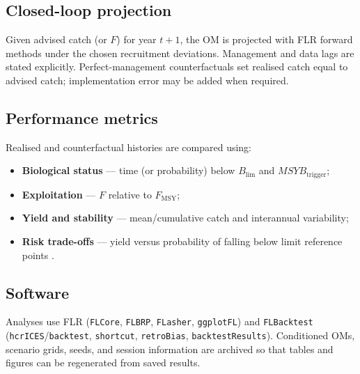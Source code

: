 \subsection{Closed-loop projection}

Given advised catch (or \(F\)) for year \(t{+}1\), the OM is projected with
FLR forward methods under the chosen recruitment deviations. Management and
data lags are stated explicitly. Perfect-management counterfactuals set
realised catch equal to advised catch; implementation error may be added when
required.

\subsection{Performance metrics}

Realised and counterfactual histories are compared using:
\begin{itemize}
  \item \textbf{Biological status} --- time (or probability) below
        \(B_{\lim}\) and \(MSYB_{\mathrm{trigger}}\);
  \item \textbf{Exploitation} --- \(F\) relative to \(F_{\mathrm{MSY}}\);
  \item \textbf{Yield and stability} --- mean/cumulative catch and interannual
        variability;
  \item \textbf{Risk trade-offs} --- yield versus probability of falling below
        limit reference points \citep{Punt2016MSE}.
\end{itemize}

\subsection{Software}

Analyses use FLR (\texttt{FLCore}, \texttt{FLBRP}, \texttt{FLasher},
\texttt{ggplotFL}) and \texttt{FLBacktest} (\texttt{hcrICES}/\texttt{backtest},
\texttt{shortcut}, \texttt{retroBias}, \texttt{backtestResults}). Conditioned
OMs, scenario grids, seeds, and session information are archived so that
tables and figures can be regenerated from saved results.
